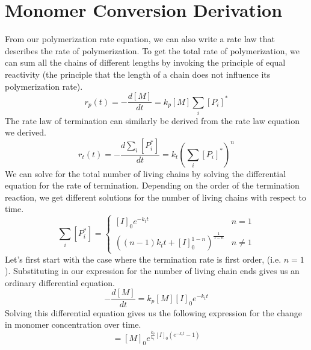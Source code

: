 \documentclass[12pt]{article}
\begin{document}
\section*{Monomer Conversion Derivation}
From our polymerization rate equation, we can also write a rate law that describes the rate of polymerization. To get the total rate of polymerization, we can sum all the chains of different lengths by invoking the principle of equal reactivity (the principle that the length of a chain does not influence its polymerization rate).
\begin{equation}
  r_p(t)=-\frac{d[M]}{dt}=k_p[M]\sum_i[P_i]^*
\end{equation}
The rate law of termination can similarly be derived from the rate law equation we derived.
\begin{equation}
  r_t(t)=-\frac{d\sum_i[P_i^*]}{dt}=k_t\left(\sum_i[P_i]^*\right)^n
\end{equation}
We can solve for the total number of living chains by solving the differential equation for the rate of termination. Depending on the order of the termination reaction, we get different solutions for the number of living chains with respect to time.
\begin{equation}
  \sum_i[P_i^*]=\begin{cases}
                  [I]_0e^{-k_tt} & n=1\\
                  \left((n-1)k_tt+[I]_0^{1-n}\right)^{\frac{1}{1-n}} & n\neq 1
                \end{cases}
\end{equation}
Let's first start with the case where the termination rate is first order, (i.e. $n=1$). Substituting in our expression for the number of living chain ends gives us an ordinary differential equation.
\begin{equation}
  -\frac{d[M]}{dt}=k_p[M][I]_0e^{-k_tt}
\end{equation}
Solving this differential equation gives us the following expression for the change in monomer concentration over time.
\begin{equation}
  [M]=[M]_0e^{\frac{k_p}{k_t}[I]_0\left(e^{-k_tt}-1\right)}
\end{equation}
\end{document}
